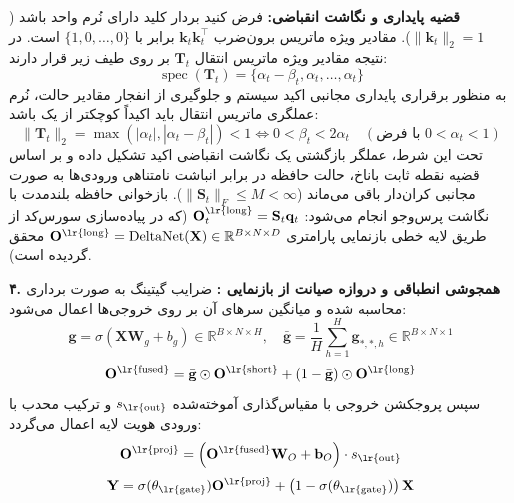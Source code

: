 \textbf{قضیه پایداری و نگاشت انقباضی:} فرض کنید بردار کلید دارای نُرم واحد باشد ($\|\mathbf{k}_t\|_2 = 1$). مقادیر ویژه ماتریس برون‌ضرب $\mathbf{k}_t \mathbf{k}_t^\top$ برابر با $\{1, 0, \dots, 0\}$ است. در نتیجه مقادیر ویژه ماتریس انتقال $\mathbf{T}_t$ بر روی طیف زیر قرار دارند:
\begin{equation}
\operatorname{spec}(\mathbf{T}_t) = \{\alpha_t - \beta_t, \alpha_t, \dots, \alpha_t\}
\end{equation}
به منظور برقراری پایداری مجانبی اکید سیستم و جلوگیری از انفجار مقادیر حالت، نُرم عملگری ماتریس انتقال باید اکیداً کوچکتر از یک باشد:
\begin{equation}
\|\mathbf{T}_t\|_2 = \max\left( |\alpha_t|, |\alpha_t - \beta_t| \right) < 1 \iff 0 < \beta_t < 2\alpha_t \quad (\text{با فرض } 0 < \alpha_t < 1)
\end{equation}
تحت این شرط، عملگر بازگشتی یک نگاشت انقباضی اکید  تشکیل داده و بر اساس قضیه نقطه ثابت باناخ، حالت حافظه در برابر انباشت نامتناهی ورودی‌ها به صورت مجانبی کران‌دار باقی می‌ماند ($\|\mathbf{S}_t\|_F \le M < \infty$). بازخوانی حافظه بلندمدت با نگاشت پرس‌وجو انجام می‌شود: $\mathbf{O}_t^{\text{\lr{long}}} = \mathbf{S}_t \mathbf{q}_t$ (که در پیاده‌سازی سورس‌کد از طریق لایه خطی بازنمایی پارامتری $\mathbf{O}^{\text{\lr{long}}} = \operatorname{DeltaNet}(\mathbf{X}) \in \mathbb{R}^{B \times N \times D}$ محقق گردیده است).

\textbf{۴. همجوشی انطباقی و دروازه صیانت از بازنمایی :}
ضرایب گیتینگ به صورت برداری محاسبه شده و میانگین سرهای آن بر روی خروجی‌ها اعمال می‌شود:
\begin{equation}
\mathbf{g} = \sigma\left( \mathbf{X} \mathbf{W}_g + b_g \right) \in \mathbb{R}^{B \times N \times H}, \quad \bar{\mathbf{g}} = \frac{1}{H}\sum_{h=1}^H \mathbf{g}_{*, *, h} \in \mathbb{R}^{B \times N \times 1}
\end{equation}
\begin{equation}
\mathbf{O}^{\text{\lr{fused}}} = \bar{\mathbf{g}} \odot \mathbf{O}^{\text{\lr{short}}} + (1 - \bar{\mathbf{g}}) \odot \mathbf{O}^{\text{\lr{long}}}
\end{equation}
سپس پروجکشن خروجی با مقیاس‌گذاری آموخته‌شده $s_{\text{\lr{out}}}$ و ترکیب محدب با ورودی هویت لایه اعمال می‌گردد:
\begin{equation}
\mathbf{O}^{\text{\lr{proj}}} = \left( \mathbf{O}^{\text{\lr{fused}}} \mathbf{W}_O + \mathbf{b}_O \right) \cdot s_{\text{\lr{out}}}
\end{equation}
\begin{equation}
\mathbf{Y} = \sigma(\theta_{\text{\lr{gate}}}) \mathbf{O}^{\text{\lr{proj}}} + \left(1 - \sigma(\theta_{\text{\lr{gate}}})\right) \mathbf{X}
\end{equation}

